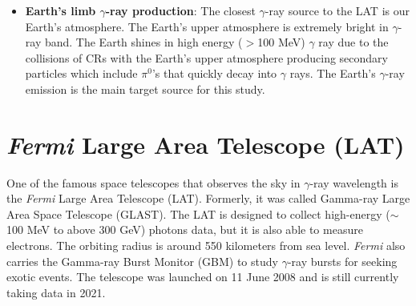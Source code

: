 \begin{itemize}
    

    \item \textbf{Earth's limb $\gamma$-ray production}:
    The closest $\gamma$-ray source to the LAT is our Earth's atmosphere.
    The Earth's upper atmosphere is extremely bright 
    in $\gamma$-ray band. The Earth shines in high energy
    ($>$100 MeV) $\gamma$ ray due to the collisions of CRs with
    the Earth's upper atmosphere producing secondary particles
    which include $\pi^0$'s that quickly decay into $\gamma$ rays.
    The Earth's $\gamma$-ray emission is the main target source
    for this study.

\end{itemize}



\section{\textit{Fermi} Large Area Telescope (LAT)}
One of the famous space telescopes that
observes the sky in $\gamma$-ray wavelength is the
\textit{Fermi} Large Area Telescope (LAT).
Formerly, it was called Gamma-ray Large Area Space Telescope (GLAST).
The LAT is designed to collect high-energy ($\sim$100 MeV to above 300 GeV)
photons data, but it is also able to measure electrons.
The orbiting radius is around 550 kilometers
from sea level.
\textit{Fermi} also carries
the Gamma-ray Burst Monitor (GBM) to study $\gamma$-ray
bursts for seeking exotic events. The telescope was launched
on 11 June 2008 and is still currently taking data in 2021.


